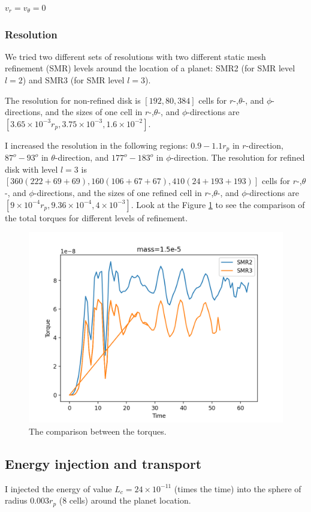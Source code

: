 \documentclass[twocolumn]{aastex631}
\begin{document}
$v_r=v_\theta=0$

\subsubsection{Resolution}
We tried two different sets of resolutions with two different static mesh refinement (SMR) levels around the location of a planet: SMR2 (for SMR level $l=2$) and SMR3 (for SMR level $l=3$).

The resolution for non-refined disk is $[192,80,384]$ cells for $r$-,$\theta$-, and $\phi$-directions, and the sizes of one cell in $r$-,$\theta$-, and $\phi$-directions are $[3.65\times 10^{-3}r_p, 3.75\times 10^{-3}, 1.6\times 10^{-2}]$. 

I increased the resolution in the following regions: $0.9-1.1 r_p$ in $r$-direction, $87^o-93^o$ in $\theta$-direction, and $177^o-183^o$ in $\phi$-direction. The resolution for refined disk with level $l=3$ is $[360 (222+69+69),160 (106+67+67),410 (24+193+193)]$ cells for $r$-,$\theta$-, and $\phi$-directions, and the sizes of one refined cell in $r$-,$\theta$-, and $\phi$-directions are $[9\times 10^{-4}r_p, 9.36\times 10^{-4}, 4\times 10^{-3}]$.
Look at the Figure \ref{fig:twotorques} to see the comparison of the total torques for different levels of refinement.
\begin{figure}
\centering
	\includegraphics[width=0.6\columnwidth]{comparison_torques.png}
    \caption{The comparison between the torques.}
    \label{fig:twotorques}
\end{figure}



\subsection{Energy injection and transport}
I injected the energy of value $L_c=24\times 10^{-11}$ (times the time) into the sphere of radius $0.003 r_p$ (8 cells) around the planet location.
\end{document}
